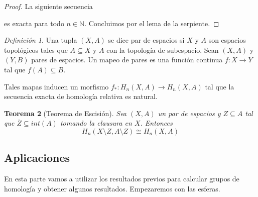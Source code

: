 \documentclass[aop]{imsart2}
\theoremstyle{plain}
\newtheorem{teo}{Teorema}[section]
\theoremstyle{remark}
\newtheorem{dfn}[teo]{Definición}
\def \N {\mathbb{N}}
\begin{document}
\begin{proof}
    La siguiente secuencia

    \vspace{2mm}
    \centerline{
    }
    \vspace{2mm}
    \noindent es exacta para todo $n\in\N$. Concluimos por el lema de la serpiente.
\end{proof}

\begin{dfn}
    Una tupla $(X,A)$ se dice par de espacios si $X$ y $A$ son espacios topológicos tales que 
    $A\subseteq X$ y $A$ con la topología de subespacio. Sean $(X,A)$ y $(Y,B)$ pares de espacios. 
    Un mapeo de pares es una función continua $f:X\to Y$ tal que $f(A)\subseteq B$.
\end{dfn}

\vspace{2mm}
\noindent Tales mapas inducen un morfismo $f_{*}:H_{n}(X,A)\to H_{n}(X,A)$ tal que la secuencia 
exacta de homología relativa es natural.

\begin{teo}[Teorema de Escisión]
    Sea $(X,A)$ un par de espacios y $Z\subseteq A$ tal que $\overline{Z}\subseteq int(A)$ tomando
    la clausura en $X$. Entonces
    \begin{equation*}
        H_{n}(X\setminus Z,A\setminus Z)\cong H_{n}(X,A)
    \end{equation*}
\end{teo}

\subsection{Aplicaciones} \hspace{2mm}

\vspace{2mm}
\noindent En esta parte vamos a utilizar los resultados previos para calcular grupos de homología
y obtener algunos resultados. Empezaremos con las esferas.
\end{document}
